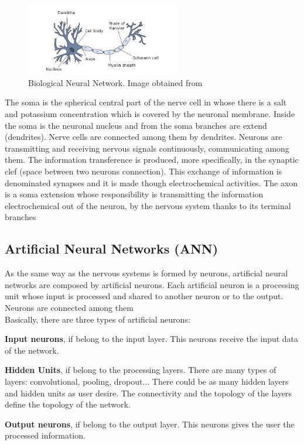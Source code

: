 \begin{figure}[htb]
\centering
\includegraphics[width=0.6\textwidth]{images_miscelaneus/neuron.png}
\caption{Biological Neural Network. Image obtained from \cite{BINN}} \label{fig:Bio-Neuron}
\end{figure}

The soma is the spherical central part of the nerve cell in whose there is a salt and potassium concentration which is covered by the neuronal membrane. Inside the soma is the neuronal nucleus and from the soma branches are extend (dendrites). Nerve cells are connected among them by dendrites. Neurons are transmitting and receiving nervous signals continuously, communicating among them. The information transference is produced, more specifically, in the synaptic clef (space between two neurons connection). This exchange of information is denominated synapses and it is made though electrochemical activities. The axon is a soma extension whose responsibility is transmitting the information electrochemical out of the neuron, by the nervous system thanks to its terminal branches \cite{BINN, neuroscience}\\

\subsection{Artificial Neural Networks (ANN)}
As the same way as the nervous systems is formed by neurons, artificial neural networks are composed by artificial neurons. Each artificial neuron is a processing unit whose input is processed and shared to another neuron or to the output. Neurons are connected among them \cite{BINN}\\

Basically, there are three types of artificial neurons:
\begin{description}[noitemsep,topsep=8pt,parsep=0pt,partopsep=20pt]
\item \textbf{Input neurons}, if belong to the input layer. This neurons receive the input data of the network.
\item \textbf{Hidden Units}, if belong to the processing layers. There are many types of layers: convolutional, pooling, dropout... There could be as many hidden layers and hidden units as user desire. The connectivity and the topology of the layers define the topology of the network.
\item \textbf{Output neurons}, if belong to the output layer. This neurons gives the user the processed information.
\end{description}

